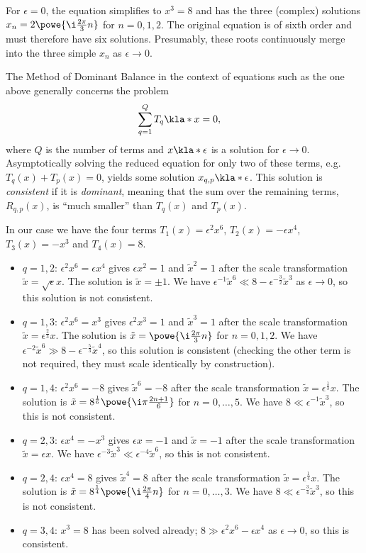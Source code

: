 \documentclass[english, parskip=full]{scrbook}
\newcommand{\definition}[2]{\begin{tcolorbox}[colback=colorbackgrounddefinition,colframe=colordefinition, breakable,enhanced,title=\textbf{#1}.]#2\end{tcolorbox}}
\begin{document}
For $\epsilon=0$, the equation simplifies to $x^3=8$ and has the three (complex) solutions $x_n = 2 \powe{\i \frac{2\pi}{3} n}$ for $n=0,1,2$.
The original equation is of sixth order and must therefore have six solutions.
Presumably, these roots continuously merge into the three simple $x_n$ as $\epsilon\rightarrow 0$.
\definition{Dominant Balance}{The Method of Dominant Balance in the context of equations such as the one above generally concerns the problem
\begin{align}
\sum_{q=1}^Q T_q\kla*{x} &= 0,
\end{align}
where $Q$ is the number of terms and $x\kla*{\epsilon}$ is a solution for $\epsilon\rightarrow 0$.
Asymptotically solving the reduced equation for only two of these terms, e.g. $T_q(x) + T_p(x) = 0$, yields some solution $x_{q,p}\kla*{\epsilon}$.
This solution is \emph{consistent} if it is \emph{dominant}, meaning that the sum over the remaining terms, $R_{q,p}(x)$, is ``much smaller'' than $T_q(x)$ and $T_p(x)$.}
In our case we have the four terms $T_1(x) = \epsilon^2 x^6$, $T_2(x) = -\epsilon x^4$, $T_3(x) = -x^3$ and $T_4(x)=8$.
\begin{itemize}
\item $q=1,2$: $\epsilon^2 x^6 = \epsilon x^4$ gives $\epsilon x^2 = 1$ and $\tilde{x}^2 = 1$ after the scale transformation $\tilde{x} = \sqrt{\epsilon} x$. The solution is $\tilde{x} = \pm 1$. We have $\epsilon^{-1} \tilde{x}^6 \ll 8-\epsilon^{-\frac{3}{2}} \tilde{x}^3$ as $\epsilon\rightarrow 0$, so this solution is not consistent.
\item $q=1,3$: $\epsilon^2 x^6 = x^3$ gives $\epsilon^2 x^3 = 1$ and $\tilde{x}^3=1$ after the scale transformation $\tilde{x} = \epsilon^\frac{2}{3} x$. The solution is $\tilde{x} = \powe{\i \frac{2\pi}{3} n}$ for $n=0,1,2$. We have $\epsilon^{-2} \tilde{x}^6 \gg 8 - \epsilon^{-\frac{5}{3}} \tilde{x}^4$, so this solution is consistent (checking the other term is not required, they must scale identically by construction).
\item $q=1,4$: $\epsilon^2 x^6 = -8$ gives $\tilde{x}^6 = -8$ after the scale transformation $\tilde{x} = \epsilon^\frac{1}{3} x$. The solution is $\tilde{x} = 8^\frac{1}{6} \powe{\i \pi \frac{2n+1}{6}}$ for $n=0,\dots,5$. We have $8 \ll \epsilon^{-1} \tilde{x}^3$, so this is not consistent.
\item $q=2,3$: $\epsilon x^4 = -x^3$ gives $\epsilon x = -1$ and $\tilde{x} = -1$ after the scale transformation $\tilde{x} = \epsilon x$. We have $\epsilon^{-3} \tilde{x}^3 \ll \epsilon^{-4} \tilde{x}^6$, so this is not consistent.
\item $q=2,4$: $\epsilon x^4 = 8$ gives $\tilde{x}^4 = 8$ after the scale transformation $\tilde{x} = \epsilon^\frac{1}{4} x$. The solution is $\tilde{x} = 8^\frac{1}{4} \powe{\i \frac{2\pi}{4} n}$ for $n=0,\dots,3$. We have $8 \ll \epsilon^{-\frac{3}{4}} \tilde{x}^3$, so this is not consistent.
\item $q=3,4$: $x^3=8$ has been solved already; $8 \gg \epsilon^2 x^6 - \epsilon x^4$ as $\epsilon\rightarrow 0$, so this is consistent.
\end{itemize}
\end{document}
